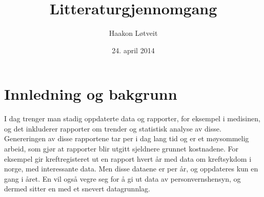 \documentclass[11pt]{article}
\begin{document}
\title{Litteraturgjennomgang}
\author{Haakon Løtveit}
\date{24. april 2014}
\maketitle


\section{Innledning og bakgrunn}
I dag trenger man stadig oppdaterte data og rapporter, for eksempel i medisinen, og det inkluderer rapporter om trender og statistisk analyse av disse.
Genereringen av disse rapportene tar per i dag lang tid og er et møysommelig arbeid, som gjør at rapporter blir utgitt sjeldnere grunnet kostnadene.
For eksempel gir kreftregisteret ut en rapport hvert år med data om kreftsykdom i norge, med interessante data. Men disse dataene er per år, og oppdateres kun en gang i året.
En vil også vegre seg for å gi ut data av personvernshensyn, og dermed sitter en med et snevert datagrunnlag.
\end{document}
